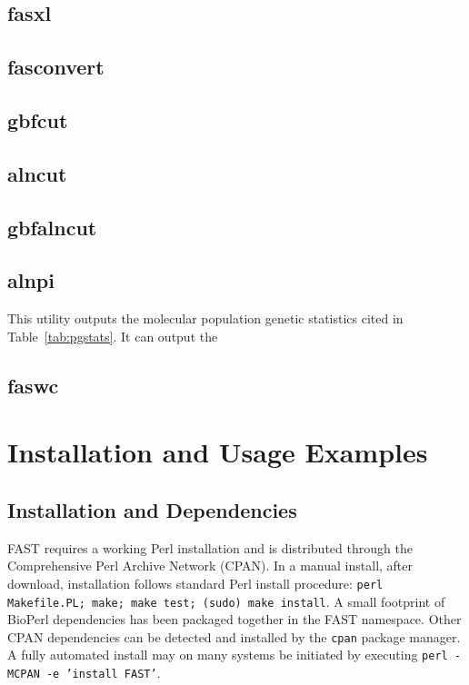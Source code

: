 \documentclass{frontiersSCNS} %
\begin{document}
\subsection{fasxl}

\subsection{fasconvert}
   
\subsection{gbfcut} 

\subsection{alncut}

\subsection{gbfalncut}
    

\subsection{alnpi}
    
This utility outputs the molecular population genetic statistics cited
in Table~\ref{tab:pgstats}. It can output the 

\subsection{faswc}

\section{Installation and Usage Examples}

\subsection{Installation and Dependencies}
FAST requires a working Perl installation and is distributed through
the Comprehensive Perl Archive Network (CPAN). In a manual install,
after download, installation follows standard Perl install procedure:
{\tt perl Makefile.PL; make; make test; (sudo) make install}. A small
footprint of BioPerl dependencies has been packaged together in the
FAST namespace. Other CPAN dependencies can be detected and installed
by the {\tt cpan} package manager. A fully automated install may on
many systems be initiated by executing {\tt perl -MCPAN -e 'install
  FAST'}.
\end{document}
